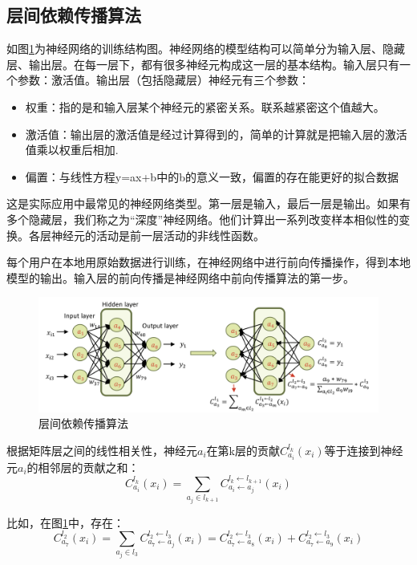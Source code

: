 \subsection{层间依赖传播算法}
如图\ref{fig:层间依赖传播算法}为神经网络的训练结构图。神经网络的模型结构可以简单分为输入层、隐藏层、输出层。在每一层下，都有很多神经元构成这一层的基本结构。输入层只有一个参数：激活值。输出层（包括隐藏层）神经元有三个参数：
\begin{itemize}
	\item 权重：指的是和输入层某个神经元的紧密关系。联系越紧密这个值越大。
	\item 激活值：输出层的激活值是经过计算得到的，简单的计算就是把输入层的激活值乘以权重后相加.
	\item 偏置：与线性方程y=ax+b中的b的意义一致，偏置的存在能更好的拟合数据
\end{itemize}

这是实际应用中最常见的神经网络类型。第一层是输入，最后一层是输出。如果有多个隐藏层，我们称之为“深度”神经网络。他们计算出一系列改变样本相似性的变换。各层神经元的活动是前一层活动的非线性函数。

每个用户在本地用原始数据进行训练，在神经网络中进行前向传播操作，得到本地模型的输出。输入层的前向传播是神经网络中前向传播算法的第一步。

\begin{figure}[!hbt]
\centering
	\includegraphics[scale=0.5]{fig2/C3/前向传播算法}%
	\caption{层间依赖传播算法}
	\label{fig:层间依赖传播算法}	
\end{figure}

根据矩阵层之间的线性相关性，神经元$a_{i}$在第k层的贡献$C_{a_{i}}^{l_{k}}\left(x_{i}\right)$等于连接到神经元$a_{i}$的相邻层的贡献之和：
\begin{equation}\label{eq:层间传播1}
C_{a_{i}}^{l_{k}}\left(x_{i}\right)=\sum_{a_{j} \in l_{k+1}} C_{a_{i} \leftarrow a_{j}}^{l_{k} \leftarrow l_{k+1}}\left(x_{i}\right)
\end{equation}

比如，在图\ref{fig:层间依赖传播算法}中，存在：
\begin{equation}\label{eq:层间传播2}
C_{a_{7}}^{l_{2}}\left(x_{i}\right)=\sum_{a_{j} \in l_{3}} C_{a_{7} \leftarrow a_{j}}^{l_{2} \leftarrow l_{3}}\left(x_{i}\right)=C_{a_{7} \leftarrow a_{8}}^{l_{2} \leftarrow l_{3}}\left(x_{i}\right)+C_{a_{7} \leftarrow a_{9}}^{l_{2} \leftarrow l_{3}}\left(x_{i}\right)
\end{equation}

